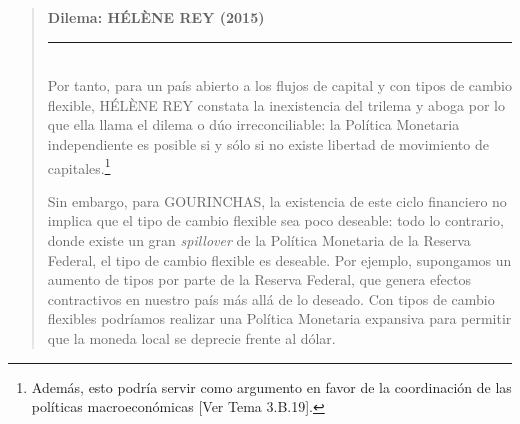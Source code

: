 \documentclass[10pt,a4paper]{article}
\newenvironment{specialblock}[1]{%
      \begin{quote} %
      \small %
      \noindent\textbf{#1}\\[-0.3em] %
      \rule{\linewidth}{0.4pt}\\[0.6em]}{
      \end{quote}}
\newcommand{\authorfont}[1]{{\fontfamily{EBGaramond-TLF}\selectfont #1}}
\begin{document}
\begin{specialblock}{\textbf{Dilema:} HÉLÈNE REY (2015)}
  Por tanto, para un país abierto a los flujos de capital y con tipos de cambio flexible, HÉLÈNE REY constata la inexistencia del trilema y aboga por lo que ella llama el dilema o dúo irreconciliable: la Política Monetaria independiente es posible si y sólo si no existe libertad de movimiento de capitales.\footnote{%
      Además, esto podría servir como argumento en favor de la coordinación de las políticas macroeconómicas [\authorfont{Ver Tema 3.B.19}].
  }

  Sin embargo, para GOURINCHAS, la existencia de este ciclo financiero no implica que el tipo de cambio flexible sea poco deseable: todo lo contrario, donde existe un gran \textit{spillover} de la Política Monetaria de la Reserva Federal, el tipo de cambio flexible es deseable. Por ejemplo, supongamos un aumento de tipos por parte de la Reserva Federal, que genera efectos contractivos en nuestro país más allá de lo deseado. Con tipos de cambio flexibles podríamos realizar una Política Monetaria expansiva para permitir que la moneda local se deprecie frente al dólar.


\end{specialblock}
\end{document}
